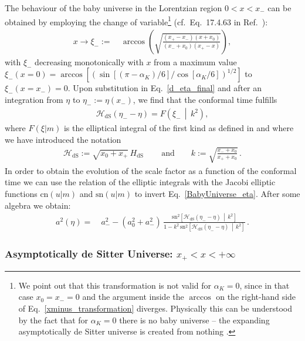 \documentclass[aps,nofootinbib,prd,superscriptaddress,eqsecnum,showpacs,showkeys,preprintnumbers,altaffilletter]{revtex4}
\newcommand{\sn}{\mathrm{sn}}
\newcommand{\HdS}{H_\mathrm{dS}}
\newcommand{\cHdS}{{\mathcal{H}}_{\mathrm{dS}}}
\begin{document}
The behaviour of the baby universe in the Lorentzian region $0 < x < x_-$ can be obtained by employing the change of variable\footnote{We point out that this transformation is not valid for $\alpha_K=0$, since in that case $x_0=x_-=0$ and the argument inside the $\arccos$ on the right-hand side of Eq.~\eqref{xminus_transformation} diverges. Physically this can be understood by the fact that for $\alpha_K=0$ there is no baby universe -- the expanding asymptotically de Sitter universe is created from nothing \cite{Vilenkin:1984wp}.} (cf.~Eq.~17.4.63 in Ref.~\cite{abra}):
\begin{align}
	\label{xminus_transformation}
	x \rightarrow\xi_- 
	:=&~ \arccos\left(\sqrt{\frac{(x_+-x_-)(x+x_0)}{(x_-+x_0)(x_+-x)}}\right),
\end{align}
with $\xi_-$ decreasing monotonically with $x$ from a maximum value $\xi_-(x=0)= \arccos[({\sin[(\pi-\alpha_K)/6]/\cos[\alpha_K/6]})^{1/2}]$ to $\xi_-(x=x_-)=0$.
Upon substitution in Eq.~\eqref{d_eta_final} and after an integration from $\eta$ to $\eta_-:=\eta(x_-)$, we find that the conformal time fulfills
\begin{align}
	\label{BabyUniverse_eta}
	\cHdS\left(\eta_- - \eta\right)
	=
	F\left(\xi_- \,\middle|\, k^ 2 \right),
\end{align}
where $F(\xi | m )$ is the elliptical integral of the first kind as defined in \cite{abra} and where we have introduced the notation
\begin{align}
	\label{cHdS_and_k_def}
	 {\cHdS} 
	 := \sqrt{x_0+x_+}\,\HdS
	\,
	 \qquad
	 \textrm{and}
	 \qquad
	k  
	:=\sqrt{\frac{x_- + x_0}{x_+ + x_0}}
	\,.
\end{align}
In order to obtain the evolution of the scale factor as a function of the conformal time we can use the relation of the elliptic integrals with the Jacobi elliptic functions $\mathrm{cn}(u|m)$ and $\mathrm{sn}(u|m)$ \cite{abra} to invert Eq.~\eqref{BabyUniverse_eta}. After some algebra we obtain:
\begin{align}
	a^2(\eta) 
	=&~
	{
	a_-^2 
	 - (a_0^2 + a_-^2)\,
	 \frac{\sn^2\left[{\cHdS}\left(\eta_--\eta\right) \,\middle|\,k^ 2\right]}
	 {1 - k^2\,\sn^2\left[{\cHdS}\left(\eta_--\eta\right) \,\middle|\, k^ 2\right]}
	 }
	\,.
\end{align}

%
%

\subsubsection{Asymptotically de Sitter Universe: $x_+ < x < +\infty$}
\end{document}

